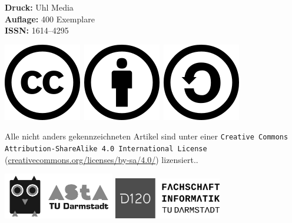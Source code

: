 \vspace{3mm}
\textbf{Druck:} Uhl Media\\
\textbf{Auflage:} 400 Exemplare\\
\textbf{ISSN:} 1614–4295

\vspace{3mm}
\begin{minipage}{0.2\textwidth}
    \includegraphics[scale=.3]{grafik/cc}~\includegraphics[scale=.3]{grafik/by}~\includegraphics[scale=.3]{grafik/sa}
\end{minipage}
\begin{minipage}{0.8\textwidth}
    Alle nicht anders gekennzeichneten Artikel sind unter einer \texttt{Creative Commons
        Attribution-ShareAlike 4.0 International License}
    (\url{creativecommons.org/licenses/by-sa/4.0/}) lizensiert..
\end{minipage}

\vspace{3mm}
\includegraphics[height=20mm]{grafik/eule_final_orange} \hspace{8mm}
\includegraphics[height=18mm]{grafik/logo_ohne_rand}

\pagebreak
